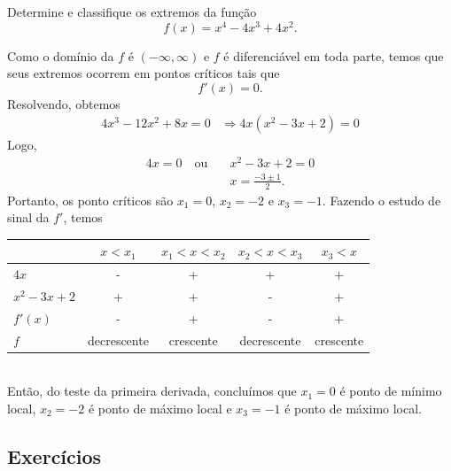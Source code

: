 \begin{exeresol}
  Determine e classifique os extremos da função
  \begin{equation}
    f(x) = x^4 - 4x^3 + 4x^2.
  \end{equation}
\end{exeresol}
\begin{resol}
  Como o domínio da $f$ é $(-\infty,\infty)$ e $f$ é diferenciável em toda parte, temos que seus extremos ocorrem em pontos críticos tais que
  \begin{equation}
    f'(x)=0.
  \end{equation}
  Resolvendo, obtemos
  \begin{align}
    4x^3-12x^2+8x=0 &\Rightarrow 4x(x^2-3x+2)=0
  \end{align}
  Logo,
  \begin{align}
    4x=0 \quad\text{ou}\quad &x^2-3x+2=0\\
                             &x = \frac{-3\pm 1}{2}.
  \end{align}
  Portanto, os ponto críticos são $x_1=0$, $x_2=-2$ e $x_3=-1$. Fazendo o estudo de sinal da $f'$, temos

  \begin{tabular}{lcccc}\hline
             & $x<x_1$ & $x_1<x<x_2$ & $x_2<x<x_3$ & $x_3<x$ \\\hline
    $4x$       & -       &     +       &     +      &   +      \\
    $x^2-3x+2$ & +       &     +       &     -      &   +   \\
    $f'(x)$    & -       &     +       &     -      &   +   \\
    $f$        & decrescente & crescente & decrescente & crescente \\\hline
  \end{tabular}\\
  
  Então, do teste da primeira derivada, concluímos que $x_1=0$ é ponto de mínimo local, $x_2=-2$ é ponto de máximo local e $x_3=-1$ é ponto de máximo local.
\end{resol}

\subsection*{Exercícios}